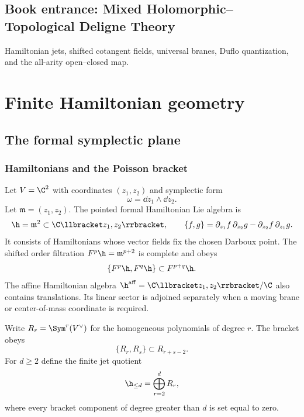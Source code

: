 \cleardoublepage
{}
{}
\chapter*{Book entrance: Mixed Holomorphic--Topological Deligne Theory}
\begin{summarybox}
Hamiltonian jets, shifted cotangent fields, universal branes, Duflo quantization, and the all-arity open--closed map.
\end{summarybox}
\part{Finite Hamiltonian geometry}

\chapter{The formal symplectic plane}
\section{Hamiltonians and the Poisson bracket}
Let $V=\C^2$ with coordinates $(z_1,z_2)$ and symplectic form
\[
 \omega=\dd z_1\wedge\dd z_2.
\]
Let $\mathfrak m=(z_1,z_2)$.  The pointed formal Hamiltonian Lie algebra is
\[
 \h=\mathfrak m^2\subset\C\llbracket z_1,z_2\rrbracket,
 \qquad
 \{f,g\}=\partial_{z_1}f\,\partial_{z_2}g-
          \partial_{z_2}f\,\partial_{z_1}g.
\]
It consists of Hamiltonians whose vector fields fix the chosen Darboux point.  The shifted order filtration $F^p\h=\mathfrak m^{p+2}$ is complete and obeys
\[
 \{F^p\h,F^q\h\}\subset F^{p+q}\h.
\]
The affine Hamiltonian algebra $\h^{\mathrm{aff}}=\C\llbracket z_1,z_2\rrbracket/\C$ also contains translations.  Its linear sector is adjoined separately when a moving brane or center-of-mass coordinate is required.

Write $R_r=\Sym^r(V^\vee)$ for the homogeneous polynomials of degree $r$.  The bracket obeys
\[
 \{R_r,R_s\}\subset R_{r+s-2}.
\]
For $d\ge2$ define the finite jet quotient
\[
 \h_{\le d}=\bigoplus_{r=2}^{d}R_r,
\]
where every bracket component of degree greater than $d$ is set equal to zero.

